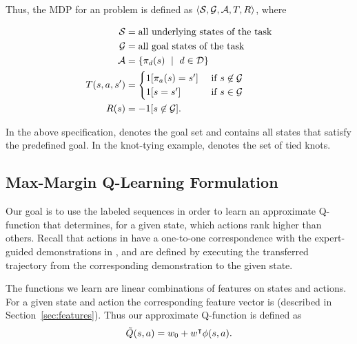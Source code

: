 Thus, the MDP for an \mmql{} problem is defined as
$\langle\mathcal{S},\mathcal{G},\mathcal{A},T,R\rangle$, where

\begin{equation}
\begin{aligned}
\stateset{} &=  \text{all underlying states of the task} \\
\goalset{} &=  \text{all goal states of the task} \\
\actionset{} &= \{\policysub{\demovar{}}{\statevar{}}\ \mid \text{ } \demovar{} \in \demoset{}\} \\
\transitionfn{}(\statevar{}, \actionvar{}, \nextstatevar{}) &=
    \begin{cases}
    1[\policysub{\actionvar{}}{\statevar{}} = \nextstatevar{}] &\text{ if } \statevar{} \not \in \goalset{} \\
    1[\statevar{} = \statevar{}'] &\text{ if } \statevar{} \in \goalset{}
    \end{cases}\\
\rewardfn{}(\statevar{}) &= -1 {[ \statevar{} \not \in \goalset{} ]}.
\end{aligned}
\label{eq:mdp}
\end{equation}

In the above specification, \goalset{} denotes the goal set and contains all
states that satisfy the predefined goal. In the knot-tying example,
\goalset{} denotes the set of tied knots. 

\subsection{Max-Margin Q-Learning Formulation}
Our goal is to use the labeled sequences  in order to learn an
approximate Q-function that determines, for a given state, which actions
rank higher than others.
Recall that actions in \actionset{} have a one-to-one correspondence with the
expert-guided demonstrations in \demoset{}, and are defined by executing the
transferred trajectory from the corresponding demonstration to the given state.

The functions we learn are linear combinations of features on states and actions.
For a given state \statevar{} and action
\actionvar{} the corresponding feature vector is \features{\statevar{}}{\actionvar{}}
(described in Section~\ref{sec:features}). Thus our approximate Q-function is defined as
\begin{equation}
\tilde{Q}(s{}, a{}) = w_0{} + w^\intercal{} \phi({s{}}, {a{}}).
\end{equation}

